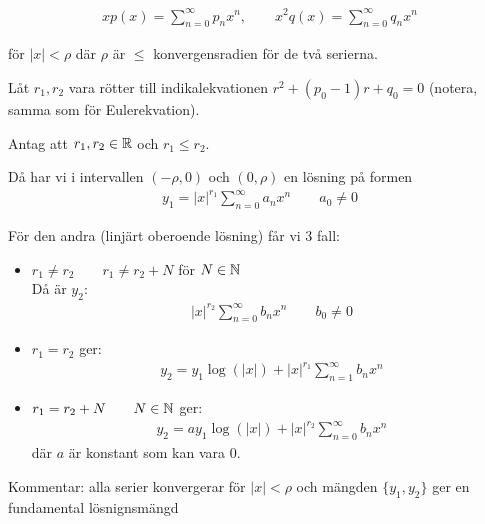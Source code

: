 \begin{theo}
  \begin{equation*}
    \begin{gathered}
      xp(x) = \sum_{n=0}^{\infty}p_nx^n,\qquad x^2q(x)=\sum_{n=0}^{\infty}q_nx^n
    \end{gathered}
  \end{equation*}\par
  \noindent för $\left|x\right|<\rho$ där $\rho$ är $\leq$ konvergensradien för de två serierna.\par\bigskip
  \noindent Låt $r_1, r_2$ vara rötter till indikalekvationen $r^2+(p_0-1)r+q_0=0$ (notera, samma som för Eulerekvation).\par
  \noindent Antag att $r_1, r_2\in\mathbb{R}$ och $r_1\leq r_2$.\par
  \noindent Då har vi i intervallen $(-\rho,0)$ och $(0,\rho)$ en lösning på formen
  \begin{equation*}
    \begin{gathered}
      y_1=\left|x\right|^{r_1}\sum_{n=0}^{\infty}a_nx^n \qquad a_0\neq0
    \end{gathered}
  \end{equation*}\par\bigskip
  \noindent För den andra (linjärt oberoende lösning) får vi 3 fall:
  \begin{itemize}
    \item $r_1\neq r_2\qquad r_1\neq r_2+N$ för $N\in\mathbb{N}$\\
      Då är $y_2$:
      \begin{equation*}
        \begin{gathered}
          \left|x\right|^{r_2}\sum_{n=0}^{\infty}b_nx^n\qquad b_0\neq0
        \end{gathered}
      \end{equation*}
    \item $r_1 = r_2$ ger:
      \begin{equation*}
        \begin{gathered}
          y_2 = y_1\log(\left|x\right|)+\left|x\right|^{r_1}\sum_{n=1}^{\infty}b_nx^n
        \end{gathered}
      \end{equation*}
    \item $r_1 = r_2 +N\qquad N\in\mathbb{N}$ ger:
      \begin{equation*}
        \begin{gathered}
          y_2 = ay_1\log(\left|x\right|)+\left|x\right|^{r_2}\sum_{n=0}^{\infty}b_nx^n
        \end{gathered}
      \end{equation*} där $a$ är konstant som kan vara 0.
  \end{itemize}
  \noindent Kommentar: alla serier konvergerar för $\left|x\right|<\rho$ och mängden $\{y_1, y_2\}$ ger en fundamental lösnignsmängd
\end{theo}
